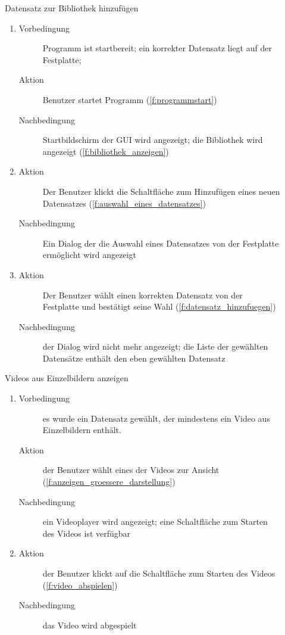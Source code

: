 \begin{description}
	\item[] Datensatz zur Bibliothek hinzufügen
	\begin{enumerate}
		\item
		\begin{description}
			\item[Vorbedingung] Programm ist startbereit; ein korrekter Datensatz liegt auf der Festplatte; %
			\item[Aktion] Benutzer startet Programm (\ref{f:programmstart})
			\item[Nachbedingung] Startbildschirm der GUI wird angezeigt; die Bibliothek wird angezeigt (\ref{f:bibliothek_anzeigen})
		\end{description}
		\item
		\begin{description}
			\item[Aktion] Der Benutzer klickt die Schaltfläche zum Hinzufügen eines neuen Datensatzes (\ref{f:auswahl_eines_datensatzes})
			\item[Nachbedingung] Ein \gls{Dialog} der die Auswahl eines Datensatzes von der Festplatte ermöglicht wird angezeigt
		\end{description}
		\item
		\begin{description}
			\item[Aktion] Der Benutzer wählt einen korrekten Datensatz von der Festplatte und bestätigt seine Wahl (\ref{f:datensatz_hinzufuegen})
			\item[Nachbedingung] der \gls{Dialog} wird nicht mehr angezeigt; die Liste der gewählten Datensätze enthält den eben gewählten Datensatz
		\end{description}
	\end{enumerate}

	\item[] Videos aus Einzelbildern anzeigen
	\begin{enumerate}
		\item
		\begin{description}
			\item[Vorbedingung] es wurde ein Datensatz gewählt, der mindestens ein Video aus Einzelbildern enthält.
			\item[Aktion] der Benutzer wählt eines der Videos zur Ansicht (\ref{f:anzeigen_groessere_darstellung})
			\item[Nachbedingung] ein Videoplayer wird angezeigt; eine Schaltfläche zum Starten des Videos ist verfügbar
		\end{description}
		\item
		\begin{description}
			\item[Aktion] der Benutzer klickt auf die Schaltfläche zum Starten des Videos (\ref{f:video_abspielen})
			\item[Nachbedingung] das Video wird abgespielt
		\end{description}
	\end{enumerate}


\end{description}
